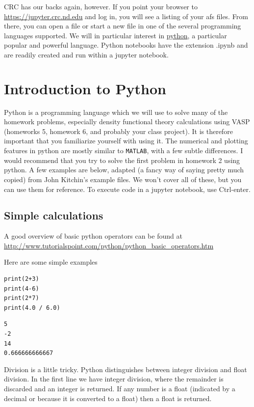 \documentclass[11pt]{article}
\begin{document}
CRC has our backs again, however.  If you point your browser to \url{https://jupyter.crc.nd.edu}
and log in, you will see a listing of your afs files.  From there, you can open a file or
start a new file in one of the several programming languages supported.  We will in
particular interest in \href{https://python.org}{python}, a particular popular and powerful language.  Python
notebooks have the extension .ipynb and are readily created and run within a jupyter notebook.

\section{Introduction to Python}
\label{sec:org7acb40b}
Python is a programming language which we will use to solve many of the homework problems,
especially density functional theory calculations using VASP (homeworks 5, homework 6, and
probably your class project). It is therefore important that you familiarize yourself with
using it. The numerical and plotting features in python are mostly similar to \texttt{MATLAB},
with a few subtle differences. I would recommend that you try to solve the first problem
in homework 2 using python. A few examples are below, adapted (a fancy way of saying
pretty much copied) from John Kitchin's example files. We won't cover all of these, but
you can use them for reference. To execute code in a jupyter notebook, use Ctrl-enter.

\subsection{Simple calculations}
\label{sec:org859d282}

A good overview of basic python operators can be found at \url{http://www.tutorialspoint.com/python/python\_basic\_operators.htm}

Here are some simple examples
\begin{verbatim}
print(2+3)
print(4-6)
print(2*7)
print(4.0 / 6.0)
\end{verbatim}

\begin{verbatim}
5
-2
14
0.666666666667
\end{verbatim}


Division is a little tricky. Python distinguishes between integer division and float division. In the first line we have integer division, where the remainder is discarded and an integer is returned. If any number is a float (indicated by a decimal or because it is converted to a float) then a float is returned.
\end{document}

